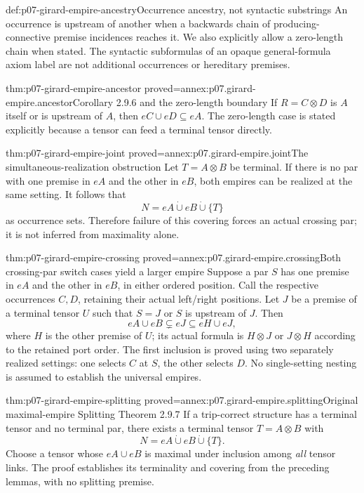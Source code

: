 \begin{hbdefinition}{def:p07-girard-empire-ancestry}{Occurrence ancestry, not syntactic substrings}
An occurrence is upstream of another when a backwards chain of
producing-connective premise incidences reaches it.
We also explicitly allow a zero-length chain when stated.
The syntactic subformulas of an opaque general-formula axiom label
are not additional occurrences or hereditary premises.
\end{hbdefinition}

\begin{hbcorollary}{thm:p07-girard-empire-ancestor}
 {proved=annex:p07.girard-empire.ancestor}{Corollary 2.9.6 and the zero-length boundary}
If \(R=C\otimes D\) is \(A\) itself or is upstream of \(A\), then
\(eC\cup eD\subseteq eA\). The zero-length case is stated explicitly
because a tensor can feed a terminal tensor directly.
\end{hbcorollary}

\begin{hblemma}{thm:p07-girard-empire-joint}
 {proved=annex:p07.girard-empire.joint}{The simultaneous-realization obstruction}
Let \(T=A\otimes B\) be terminal. If there is no par with one
premise in \(eA\) and the other in \(eB\), both empires can be
realized at the same setting. It follows that
\[
 N=eA\mathbin{\dot\cup}eB\mathbin{\dot\cup}\{T\}
\]
as occurrence sets. Therefore failure of this covering forces
an actual crossing par; it is not inferred from maximality alone.
\end{hblemma}

\begin{hblemma}{thm:p07-girard-empire-crossing}
 {proved=annex:p07.girard-empire.crossing}{Both crossing-par switch cases yield a larger empire}
Suppose a par \(S\) has one premise in \(eA\) and the other in
\(eB\), in either ordered position. Call the respective occurrences
\(C,D\), retaining their actual left/right positions. Let \(J\) be a premise of a terminal tensor \(U\)
such that \(S=J\) or \(S\) is upstream of \(J\).
Then
\[
 eA\cup eB\subsetneq eJ\subseteq
       eH\cup eJ,
\]
where \(H\) is the other premise of \(U\); its actual formula is
\(H\otimes J\) or \(J\otimes H\) according to the retained port order.
The first inclusion is proved using two separately realized settings:
one selects \(C\) at \(S\), the other selects \(D\).
No single-setting nesting is assumed to establish the universal empires.
\end{hblemma}

\begin{hbtheorem}{thm:p07-girard-empire-splitting}
 {proved=annex:p07.girard-empire.splitting}{Original maximal-empire Splitting Theorem 2.9.7}
If a trip-correct structure has a terminal tensor and no terminal par,
there exists a terminal tensor \(T=A\otimes B\) with
\[
 N=eA\mathbin{\dot\cup}eB\mathbin{\dot\cup}\{T\}.
\]
Choose a tensor whose \(eA\cup eB\) is maximal under inclusion among
\emph{all} tensor links. The proof establishes its terminality and
covering from the preceding lemmas, with no splitting premise.
\end{hbtheorem}

